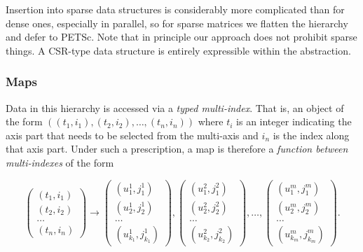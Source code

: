 


Insertion into sparse data structures is considerably more complicated than for dense ones, especially in parallel, so for sparse matrices we flatten the hierarchy and defer to PETSc.
Note that in principle our approach does not prohibit sparse things.
A CSR-type data structure is entirely expressible within the abstraction.

\subsubsection{Maps}


Data in this hierarchy is accessed via a \textit{typed multi-index}.
That is, an object of the form $((t_1, i_1), (t_2, i_2), \dots, (t_n, i_n))$ where $t_i$ is an integer indicating the axis part that needs to be selected from the multi-axis and $i_n$ is the index along that axis part.
Under such a prescription, a map is therefore a \textit{function between multi-indexes} of the form

\vspace{1em}

\begin{equation*}
  \begin{pmatrix} (t_1, i_1) \\ (t_2, i_2) \\ \dots \\ (t_n, i_n) \end{pmatrix}
  \to
  \begin{pmatrix} (u^1_1, j^1_1) \\ (u^1_2, j^1_2) \\ \dots \\ (u^1_{k_1}, j^1_{k_1}) \end{pmatrix}
  ,
  \begin{pmatrix} (u^2_1, j^2_1) \\ (u^2_2, j^2_2) \\ \dots \\ (u^2_{k_2}, j^2_{k_2}) \end{pmatrix}
  , \dots ,
  \begin{pmatrix} (u^m_1, j^m_1) \\ (u^m_2, j^m_2) \\ \dots \\ (u^m_{k_m}, j^m_{k_m}) \end{pmatrix}.
\end{equation*}

